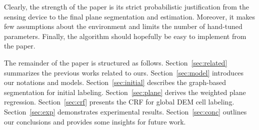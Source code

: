 Clearly, the strength of the paper is its strict probabilistic justification
from the sensing device to the final plane segmentation and estimation.
Moreover, it makes few assumptions about the environment and limits the number
of hand-tuned parameters. Finally, the algorithm should hopefully be easy to
implement from the paper.

The remainder of the paper is structured as follows. Section~\ref{sec:related}
summarizes the previous works related to ours. Section~\ref{sec:model}
introduces our notations and models. Section~\ref{sec:initial} describes the
graph-based segmentation for initial labeling. Section~\ref{sec:plane} derives
the weighted plane regression. Section~\ref{sec:crf} presents the CRF for
global DEM cell labeling. Section~\ref{sec:exp} demonstrates experimental
results. Section~\ref{sec:conc} outlines our conclusions and provides some
insights for future work.

